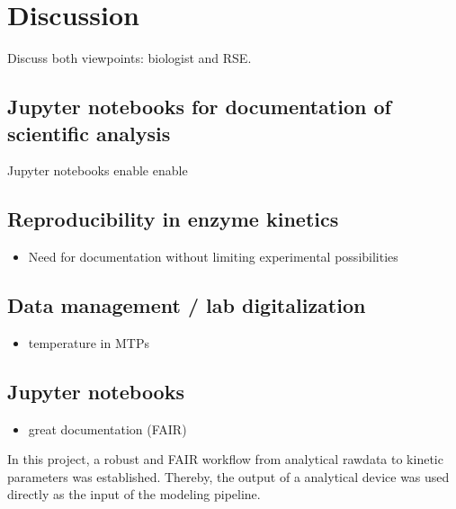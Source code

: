 \documentclass[letterpaper,10pt,english]{jupyterBook}
\begin{document}
\chapter{Discussion}
\label{\detokenize{discussion:discussion}}\label{\detokenize{discussion::doc}}
\sphinxAtStartPar
Discuss both viewpoints: biologist and RSE.


\section{Jupyter notebooks for documentation of scientific analysis}
\label{\detokenize{discussion:jupyter-notebooks-for-documentation-of-scientific-analysis}}
\sphinxAtStartPar
Jupyter notebooks enable enable


\section{Reproducibility in enzyme kinetics}
\label{\detokenize{discussion:reproducibility-in-enzyme-kinetics}}\begin{itemize}
\item {} 
\sphinxAtStartPar
Need for documentation without limiting experimental possibilities

\end{itemize}


\section{Data management / lab digitalization}
\label{\detokenize{discussion:data-management-lab-digitalization}}\begin{itemize}
\item {} 
\sphinxAtStartPar
temperature in MTPs

\end{itemize}


\section{Jupyter notebooks}
\label{\detokenize{discussion:jupyter-notebooks}}\begin{itemize}
\item {} 
\sphinxAtStartPar
great documentation (FAIR)

\end{itemize}

\sphinxAtStartPar
In this project, a robust and FAIR workflow from analytical raw\sphinxhyphen{}data to kinetic parameters was established. Thereby, the output of a analytical device was used directly as the input of the modeling pipeline.
\end{document}
